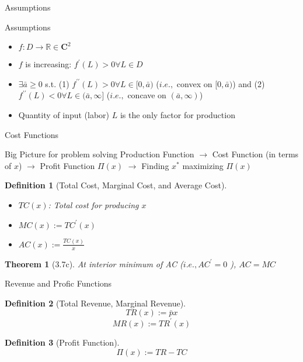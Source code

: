 \documentclass[a4paper,11pt]{article}
\newtheorem{defn}{Definition}
\newtheorem{thm}{Theorem}
\begin{document}
\begin{frame}[t]{Assumptions}
	\begin{block}
		{Assumptions}
		\begin{itemize}
			\item $f:D\rightarrow\mathbb{R}\in \mathbf{C}^2$
			\item $f$ is increasing: $f^\prime(L) >0 \forall L\in D$
			\item $\exists \bar a\ge 0$ s.t. (1) $f^{\prime\prime}(L)>0 \forall L\in[0,\bar a)$ ($i.e.,$ convex on $[0,\bar a)$) and (2) $f^{\prime\prime}(L)<0 \forall L\in(\bar a,\infty]$ ($i.e.,$ concave on $(\bar a,\infty)$)
			\item Quantity of input (labor) $L$ is the only factor for production
		\end{itemize}
	\end{block}

\end{frame}


\begin{frame}[t]{Cost Functions}
	\begin{block}
		{Big Picture for problem solving}
		Production Function $\rightarrow$ Cost Function (in terms of $x$) $\rightarrow$ Profit Function $\Pi(x)$ $\rightarrow$ Finding $x^\ast$ maximizing $\Pi(x)$
	\end{block}
	
	\begin{defn}
		[Total Cost, Marginal Cost, and Average Cost]
		\begin{itemize}
			\item $TC(x)$: Total cost for producing $x$
			\item $MC(x):= TC^\prime(x)$
			\item $AC(x):= \frac{TC(x)}{x}$
		\end{itemize}
	\end{defn}
	
	\begin{thm}
		[3.7c]
		At interior minimum of AC ($i.e.,AC^\prime=0$ ), $AC=MC$
	\end{thm}
\end{frame}

\begin{frame}[t]{Revenue and Profic Functions}
	\begin{defn}
		[Total Revenue, Marginal Revenue]
		\[
			TR(x) := \bar p x
		\]
		\[
			MR(x) := TR^\prime (x)
		\]
	\end{defn}
	\begin{defn}
		[Profit Function]
		\[
			\Pi(x) := TR-TC
		\]
	\end{defn}
\end{frame}
\end{document}
